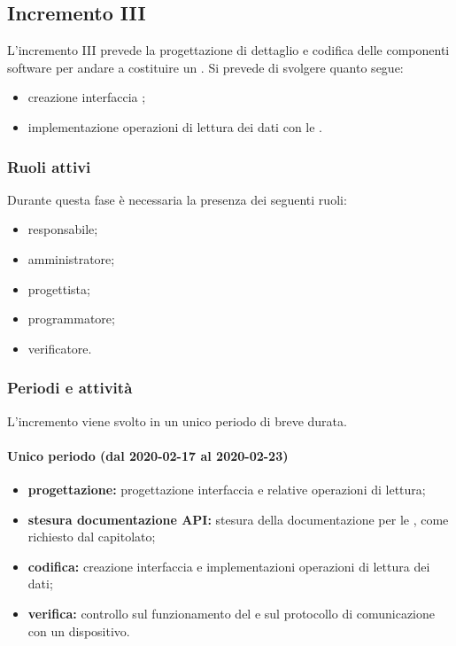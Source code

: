 
		\subsection{Incremento III}
			
			L'incremento III prevede la progettazione di dettaglio e codifica delle componenti software per andare a costituire un . Si prevede di svolgere quanto segue:
			\begin{itemize}
				\item creazione interfaccia ;
				\item implementazione operazioni di lettura dei dati con le .
			\end{itemize}
			
			\subsubsection{Ruoli attivi}
			
				Durante questa fase è necessaria la presenza dei seguenti ruoli:
				\begin{itemize}
					\item responsabile;
					\item amministratore;
					\item progettista;
					\item programmatore;
					\item verificatore.
				\end{itemize}
			
			\subsubsection{Periodi e attività}
			
				L'incremento viene svolto in un unico periodo di breve durata.
				
				\paragraph{Unico periodo (dal 2020-02-17 al 2020-02-23)}
				
					\begin{itemize}
						\item \textbf{progettazione:} progettazione interfaccia  e relative operazioni di lettura;
						\item \textbf{stesura documentazione API:} stesura della documentazione per le , come richiesto dal capitolato;
						\item \textbf{codifica:} creazione interfaccia  e implementazioni operazioni di lettura dei dati;
						\item \textbf{verifica:} controllo sul funzionamento del  e sul protocollo di comunicazione con un dispositivo.
					\end{itemize} 			

